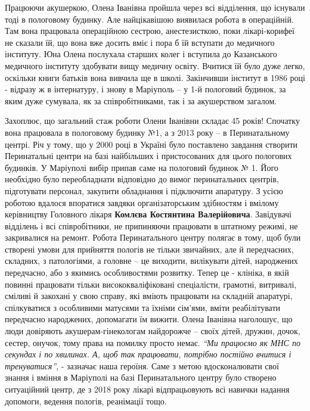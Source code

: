 Працюючи акушеркою, Олена Іванівна пройшла через всі відділення, що існували
тоді в пологовому будинку. Але найцікавішою виявилася робота в операційній. Там
вона працювала операційною сестрою, анестезисткою, поки лікарі-корифеї не
сказали їй, що вона вже досить вміє і пора б їй вступати до медичного
інституту. Юна Олена послухала старших колег і вступила до Казанського
медичного інституту здобувати вищу медичну освіту. Вчитися їй було дуже легко,
оскільки книги батьків вона вивчила ще в школі. Закінчивши інститут в 1986 році
- відразу ж в інтернатуру, і знову в Маріуполь – у 1-й пологовий будинок, за
яким дуже сумувала, як за співробітниками, так і за акушерством загалом.


Захоплює, що загальний стаж роботи Олени Іванівни складає 45 років! Спочатку
вона працювала в пологовому будинку №1, а з 2013 року – в Перинатальному
центрі. Річ у тому, що у 2000 році в Україні було поставлено завдання створити
Перинатальні центри на базі найбільших і пристосованих для цього пологових
будинків. У Маріуполі вибір припав саме на пологовий будинок № 1. Його
необхідно було переобладнати відповідно до вимог перинатальних центрів,
підготувати персонал, закупити обладнання і підключити апаратуру. З усією
роботою вдалося впоратися завдяки організаторським здібностям і вмілому
керівництву Головного лікаря \textbf{Комлєва Костянтина Валерійовича}. Завідувачі
відділень і всі співробітники, не припиняючи працювати в штатному режимі, не
закривалися на ремонт. Робота Перинатального центру полягає в тому, щоб були
створені умови для прийняття пологів не тільки звичайних, але й передчасних,
складних, з патологіями, а головне – це виходити, вилікувати дітей, народжених
передчасно, або з якимись особливостями розвитку. Тепер це - клініка, в якій
повинні працювати тільки висококваліфіковані спеціалісти, грамотні, витривалі,
сміливі й закохані у свою справу, які вміють працювати на складній апаратурі,
спілкуватися з особливими матусями та їхніми сім'ями, вміти реабілітувати
передчасно народжених, допомагати їм вижити. Олена Іванівна наголошує, що люди
довіряють акушерам-гінекологам найдорожче – своїх дітей, дружин, дочок, сестер,
онучок, тому права на помилку просто немає. \emph{\enquote{Ми працюємо як МНС по секундах і
по хвилинах. А, щоб так працювати, потрібно постійно вчитися і тренуватися}}, -
зазначає наша героїня. Саме з метою вдосконалювати свої знання і вміння в
Маріуполі на базі Перинатального центру було створено ситуаційний центр, де з
2018 року лікарі відпрацьовують всі навички надання допомоги, ведення пологів,
реанімації тощо.

